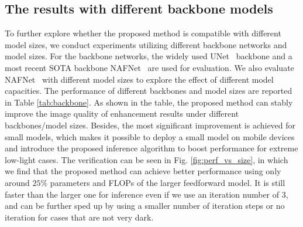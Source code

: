 \documentclass[10pt,twocolumn,letterpaper]{article}
\begin{document}
\subsection{The results with different backbone models}
To further explore whether the proposed method is compatible with different model sizes, we conduct experiments utilizing different backbone networks and model sizes. For the backbone networks, the widely used UNet~\cite{wei2020physics} backbone and a most recent SOTA backbone NAFNet~\cite{chen2022simple} are used for evaluation. We also evaluate NAFNet~\cite{chen2022simple} with different model sizes to explore the effect of different model capacities. The performance of different backbones and model sizes are reported in Table \ref{tab:backbone}. As shown in the table, the proposed method can stably improve the image quality of enhancement results under different backbones/model sizes. Besides, the most significant improvement is achieved for small models, which makes it possible to deploy a small model on mobile devices and introduce the proposed inference algorithm to boost performance for extreme low-light cases. The verification can be seen in Fig. \ref{fig:perf_vs_size}, in which we find that the proposed method can achieve better performance using only around $25\%$ parameters and FLOPs of the larger feedforward model. It is still faster than the larger one for inference even if we use an iteration number of $3$, and can be further sped up by using a smaller number of iteration steps or no iteration for cases that are not very dark.
\end{document}
